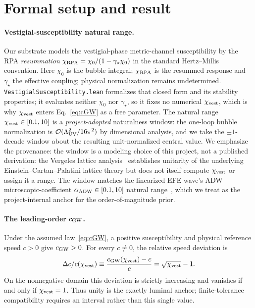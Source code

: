\documentclass[aps,prl,reprint,nofootinbib,superscriptaddress]{revtex4-2}
\newcommand{\cGW}{c_{\rm GW}}
\newcommand{\chivest}{\chi_{\rm vest}}
\newcommand{\dccap}{\Delta c/c}
\begin{document}
\section{Formal setup and result}
\label{sec:result}

\paragraph{Vestigial-susceptibility natural range.}
Our substrate models the vestigial-phase metric-channel susceptibility
by the RPA \emph{resummation}
$\chi_{\rm RPA} = \chi_0/(1 - \gamma_\star \chi_0)$ in the standard
Hertz--Millis convention. Here $\chi_0$ is the bubble integral;
$\chi_{\rm RPA}$ is the resummed response and $\gamma_\star$ the
effective coupling; physical normalization remains undetermined.
\texttt{VestigialSusceptibility.lean} formalizes that closed form and
its stability properties; it evaluates neither $\chi_0$ nor
$\gamma_\star$, so it fixes no numerical $\chivest$, which is why
$\chivest$ enters Eq.~\eqref{eq:cGW} as a free parameter. The natural range
$\chivest \in [0.1, 10]$
is a \emph{project-adopted} naturalness window: the one-loop bubble
normalization is $\mathcal{O}(\Lambda_{\rm UV}^2/16\pi^2)$ by
dimensional analysis, and we take the $\pm 1$-decade window about
the resulting unit-normalized central value. We emphasize the
provenance: the window is a modeling choice of this project, not a
published derivation: the Vergeles lattice
analysis~\cite{Vergeles2025} establishes unitarity of the underlying
Einstein--Cartan--Palatini lattice theory but does not itself
compute $\chivest$ or assign it a range. The window matches the
linearized-EFE wave's ADW microscopic-coefficient
$\alpha_{\rm ADW} \in [0.1, 10]$ natural
range~\cite{Roehm2026LinearizedEFE}, which we treat as the
project-internal anchor for the order-of-magnitude prior.

\paragraph{The leading-order $\cGW$.}
Under the assumed law~\eqref{eq:cGW}, a positive susceptibility
and physical reference speed $c>0$ give $\cGW>0$.
For every $c\ne0$, the relative speed deviation is
\[
  \dccap(\chivest)
  \equiv \frac{\cGW(\chivest)-c}{c}
  = \sqrt{\chivest}-1.
\]
On the nonnegative domain this deviation is strictly increasing
and vanishes if and only if $\chivest=1$. Thus unity is the exactly
luminal anchor; finite-tolerance compatibility requires an interval
rather than this single value.
\end{document}
